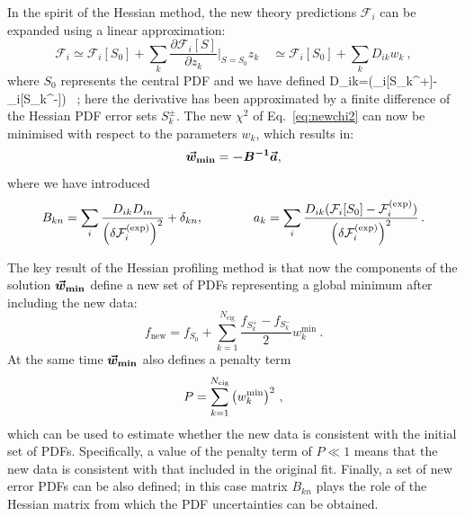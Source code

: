 In the spirit of the Hessian method, the new theory predictions $\mathcal{F}_i$ can be expanded
using a linear approximation:
\begin{equation}
\mathcal{F}_i \simeq \mathcal{F}_i[S_0] + \sum_k \frac{\partial\mathcal{F}_i[S]}{\partial z_k}\bigg|_{S=S_0} z_k \quad
              \simeq \mathcal{F}_i[S_0] + \sum_k D_{ik} w_k \ ,
\end{equation}
where $S_0$ represents the central PDF and we have defined
\be
D_{ik}=(_i[S_k^+]-_i[S_k^-]) \, ;
\ee
here the  derivative has been approximated by a finite difference of the 
Hessian PDF error sets $S_k^{\pm}$.
%
The new $\chi^2$ of Eq.~\eqref{eq:newchi2} can now be minimised with respect to the parameters $w_k$,
which results in:
\begin{equation}
\boldsymbol{\vec{w}_{\text{{\bf min}}}} = \boldsymbol{-B^{-1}} \boldsymbol{\vec{a}},
\end{equation}
where we have introduced
\begin{equation}
B_{kn} = \sum_i {{D_{ik}D_{in}}\over {\left(\delta\mathcal{F}_i^{\rm(exp)}\right)^2}} + \delta_{kn},
\qquad
\qquad
a_k = \sum_i {{D_{ik}(\mathcal{F}_i[S_0] - \mathcal{F}_i^{\rm(exp)})}\over {\left(\delta\mathcal{F}_i^{\rm(exp)}\right)^2}} \, . 
\end{equation}

The key result of the Hessian profiling method
is that now the components of the solution $\boldsymbol{\vec{w}_{\text{{\bf min}}}}$ define a new set
of PDFs representing a global minimum after including the new data:
\begin{equation}
f_{\text{new}} = f_{S_0} + \sum_{k=1}^{N_{\text{eig}}} \frac{f_{S_k^+}-f_{S_k^-}}{2} w_k^{\text{min}} \ .
\end{equation}
At the same time $\boldsymbol{\vec{w}_{\text{{\bf min}}}}$ also  defines  a penalty term 
\begin{equation}
P = \sum_{k=1}^{N_{\text{eig}}} \left( w_k^{\text{min}} \right)^2 \, ,
\end{equation}
which can be used to estimate whether the new data is consistent with the initial set of PDFs.
%
Specifically, a value of
the penalty term of $P\ll1$ means that the new data is consistent
with that included in the original fit.
%
Finally, a set of new error PDFs can be also defined; in this case matrix $B_{kn}$ plays the role of
the Hessian matrix from which the PDF uncertainties
can be obtained. 

